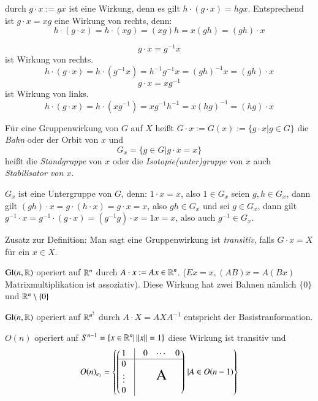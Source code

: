 \documentclass[a4paper,10pt]{scrartcl}
\begin{document}
\begin{exs*}[$G=X$]
 durch $g\cdot x:= gx$ ist eine Wirkung, denn es gilt $h\cdot (g\cdot x)=hgx$. Entsprechend ist $g\cdot x=xg$ eine Wirkung von rechts, denn:
\[
 h\cdot(g\cdot x)=h\cdot (xg)=(xg)h=x(gh)=(gh)\cdot x
\]

\[
 g\cdot x=g^{-1}x
\]
ist Wirkung von rechts.
\[
 h\cdot (g\cdot x)=h\cdot(g^{-1}x)=h^{-1}g^{-1}x=(gh)^{-1}x=(gh)\cdot x
\]
\[
 g\cdot x=xg^{-1}
\]
ist Wirkung von links.
\[
 h\cdot(g\cdot x)=h\cdot(xg^{-1})=xg^{-1}h^{-1}=x(hg)^{-1}=(hg)\cdot x
\]
\end{exs*}
\begin{df}\label{thm2:3.3}
 Für eine Gruppenwirkung von $G$ auf $X$ heißt $G\cdot x:=G(x):=\{g\cdot x|g\in G\}$ die \emph{Bahn} oder der Orbit von $x$ und
\[
 G_x=\{g\in G|g\cdot x = x\}
\]
heißt die \emph{Standgruppe} von $x$ oder die \emph{Isotopie(unter)gruppe} von $x$ auch \emph{Stabilisator von $x$}.
\end{df}
\begin{note*}
 $G_x$ ist eine Untergruppe von $G$, denn: $1\cdot x=x$, also $1\in G_x$ seien $g,h \in G_x$, dann gilt $(gh)\cdot x=g\cdot(h\cdot x)=g \cdot x=x$, also $gh\in G_x$ und sei $g\in G_x$, dann gilt $g^{-1} \cdot x=g^{-1}\cdot (g\cdot x)=(g^{-1}g)\cdot x=1x=x$, also auch $g^{-1}\in G_x$.
\end{note*}
\begin{seg}{Zusatz zur Definition:}
 Man sagt eine Gruppenwirkung ist \emph{transitiv}, falls $G\cdot x= X$ für ein $x\in X$.
\end{seg}
\begin{ex*}
 \item $\text{Gl}(n, \mathbb{R})$ operiert auf $\mathbb{R}^n$ durch $A\cdot x:= Ax\in \mathbb{R}^n$. ($Ex=x, (AB)x=A(Bx)$ Matrixmultiplikation ist assoziativ). Diese Wirkung hat zwei Bahnen nämlich $\{0\}$ und $\mathbb{R}^n\setminus\{0\}$
 \item $\text{Gl}(n, \mathbb{R})$ operiert auf $\mathbb{R}^{n^2}$ durch $A\cdot X=AXA^{-1}$ entspricht der Basistranformation.
 \item $O(n)$ operiert auf $S^{n-1}=\{x\in \mathbb{R}^n|\,||x||=1\}$ diese Wirkung ist transitiv und
\[
 O(n)_{e_1}=\left \{ \left ( \, \begin{matrix} 1 & \vline & \begin{matrix} 0 & \cdots & 0 \end{matrix}\\ \hline \begin{matrix} 0 \\ \vdots \\ 0\end{matrix}& \vline & \text{\LARGE{A}} \end{matrix}\, \right ) \, | A \in O(n-1)\right \}
\] 
\end{ex*}
\end{document}
